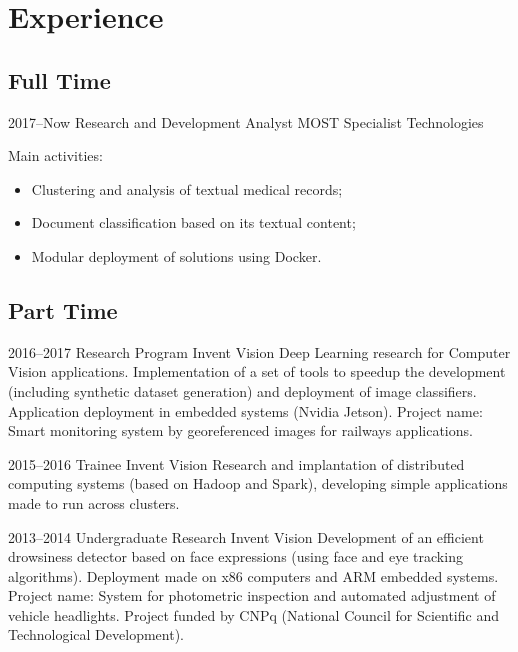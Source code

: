 \documentclass[a4paper]{cv-friggeri-x}
\begin{document}

\section{Experience}

\subsection{Full Time}

\begin{entrylist}


\entry
    {2017--Now}
    {Research and Development Analyst}
    {MOST Specialist Technologies}
    {Main activities:
    \begin{itemize}
        \item Clustering and analysis of textual medical records;
        \item Document classification based on its textual content;
        \item Modular deployment of solutions using Docker.
    \end{itemize}}


\end{entrylist}

\subsection{Part Time}

\begin{entrylist}

\entry
    {2016--2017}
    {Research Program}%
    {Invent Vision}
    {Deep Learning research for Computer Vision applications. Implementation of a set of tools to speedup the development (including synthetic dataset generation) and deployment of image classifiers. Application deployment in embedded systems (Nvidia Jetson). Project name: Smart monitoring system by georeferenced images for railways applications.}

\entry
    {2015--2016}
    {Trainee}
    {Invent Vision}
    {Research and implantation of distributed computing systems (based on Hadoop and Spark), developing simple applications made to run across clusters.}

\entry
    {2013--2014}
    {Undergraduate Research}
    {Invent Vision}
    {Development of an efficient drowsiness detector based on face expressions (using face and eye tracking algorithms). Deployment made on x86 computers and ARM embedded systems. Project name: System for photometric inspection and automated adjustment of vehicle headlights. Project funded by CNPq (National Council for Scientific and Technological Development).}



\end{entrylist}
\end{document}
